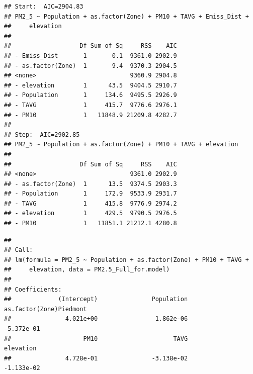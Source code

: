 \documentclass[12pt,]{article}
\newenvironment{Shaded}{\begin{snugshade}}{\end{snugshade}}
\newcommand{\KeywordTok}[1]{\textcolor[rgb]{0.13,0.29,0.53}{\textbf{#1}}}
\newcommand{\DataTypeTok}[1]{\textcolor[rgb]{0.13,0.29,0.53}{#1}}
\newcommand{\DecValTok}[1]{\textcolor[rgb]{0.00,0.00,0.81}{#1}}
\newcommand{\StringTok}[1]{\textcolor[rgb]{0.31,0.60,0.02}{#1}}
\newcommand{\CommentTok}[1]{\textcolor[rgb]{0.56,0.35,0.01}{\textit{#1}}}
\newcommand{\OperatorTok}[1]{\textcolor[rgb]{0.81,0.36,0.00}{\textbf{#1}}}
\newcommand{\NormalTok}[1]{#1}
\begin{document}
\begin{Shaded}
\end{Shaded}

\begin{verbatim}
## Start:  AIC=2904.83
## PM2_5 ~ Population + as.factor(Zone) + PM10 + TAVG + Emiss_Dist + 
##     elevation
## 
##                   Df Sum of Sq     RSS    AIC
## - Emiss_Dist       1       0.1  9361.0 2902.9
## - as.factor(Zone)  1       9.4  9370.3 2904.5
## <none>                          9360.9 2904.8
## - elevation        1      43.5  9404.5 2910.7
## - Population       1     134.6  9495.5 2926.9
## - TAVG             1     415.7  9776.6 2976.1
## - PM10             1   11848.9 21209.8 4282.7
## 
## Step:  AIC=2902.85
## PM2_5 ~ Population + as.factor(Zone) + PM10 + TAVG + elevation
## 
##                   Df Sum of Sq     RSS    AIC
## <none>                          9361.0 2902.9
## - as.factor(Zone)  1      13.5  9374.5 2903.3
## - Population       1     172.9  9533.9 2931.7
## - TAVG             1     415.8  9776.9 2974.2
## - elevation        1     429.5  9790.5 2976.5
## - PM10             1   11851.1 21212.1 4280.8
\end{verbatim}

\begin{verbatim}
## 
## Call:
## lm(formula = PM2_5 ~ Population + as.factor(Zone) + PM10 + TAVG + 
##     elevation, data = PM2.5_Full_for.model)
## 
## Coefficients:
##             (Intercept)               Population  as.factor(Zone)Piedmont  
##               4.021e+00                1.862e-06               -5.372e-01  
##                    PM10                     TAVG                elevation  
##               4.728e-01               -3.138e-02               -1.133e-02
\end{verbatim}
\end{document}
